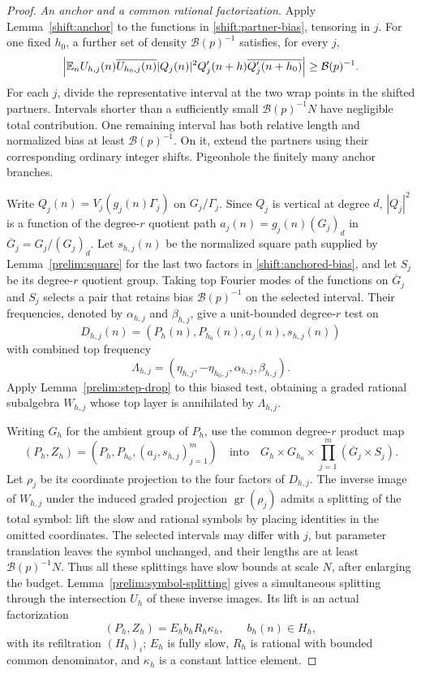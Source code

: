 \begin{proof}
\emph{An anchor and a common rational factorization.}
Apply Lemma~\ref{shift:anchor} to the functions in
\eqref{shift:partner-bias}, tensoring in $j$.
For one fixed $h_0$, a further set of density
$\mathcal B(p)^{-1}$ satisfies, for every $j$,
\begin{equation}\label{shift:anchored-bias}
 \left|\mathbb E_n U_{h,j}(n)\overline{U_{h_0,j}(n)}
 |Q_j(n)|^2Q'_j(n+h)\overline{Q'_j(n+h_0)}\right|
 \geq\mathcal B(p)^{-1}.
\end{equation}
For each $j$, divide the representative interval at the two wrap
points in the shifted partners.  Intervals shorter than a
sufficiently small $\mathcal B(p)^{-1}N$ have negligible total
contribution.  One remaining interval has both relative length
and normalized bias at least $\mathcal B(p)^{-1}$.
On it, extend the partners using their corresponding ordinary
integer shifts.  Pigeonhole the finitely many anchor branches.

Write $Q_j(n)=V_j(g_j(n)\Gamma_j)$ on $G_j/\Gamma_j$.
Since $Q_j$ is vertical at degree $d$, $|Q_j|^2$ is a function
of the degree-$r$ quotient path $a_j(n)=g_j(n)(G_j)_d$ in
$\overline G_j=G_j/(G_j)_d$.
Let $s_{h,j}(n)$ be the normalized square path supplied by
Lemma~\ref{prelim:square} for the last two factors in
\eqref{shift:anchored-bias}, and let $S_j$ be its degree-$r$
quotient group.  Taking top Fourier modes of the functions on
$\overline G_j$ and $S_j$ selects a pair that retains bias
$\mathcal B(p)^{-1}$ on the selected interval.  Their frequencies,
denoted by $\alpha_{h,j}$ and $\beta_{h,j}$, give a unit-bounded
degree-$r$ test on
\[
 D_{h,j}(n)=(P_h(n),P_{h_0}(n),a_j(n),s_{h,j}(n))
\]
with combined top frequency
\[
 \Lambda_{h,j}
 = (\eta_{h,j},-\eta_{h_0,j},\alpha_{h,j},\beta_{h,j}).
\]
Apply Lemma~\ref{prelim:step-drop} to this biased test, obtaining
a graded rational subalgebra $W_{h,j}$ whose top layer is
annihilated by $\Lambda_{h,j}$.

Writing $G_h$ for the ambient group of $P_h$, use the common
degree-$r$ product map
\[
 (P_h,Z_h)=(P_h,P_{h_0},(a_j,s_{h,j})_{j=1}^m)
 \quad\text{into}\quad
 G_h\times G_{h_0}\times\prod_{j=1}^m(\overline G_j\times S_j).
\]
Let $\rho_j$ be its coordinate projection to the four factors
of $D_{h,j}$.  The inverse image of $W_{h,j}$ under the induced
graded projection $\operatorname{gr}(\rho_j)$ admits a splitting
of the total symbol: lift the slow and rational symbols by placing
identities in the omitted coordinates.  The selected intervals may
differ with $j$, but parameter translation leaves the symbol unchanged,
and their lengths are at least $\mathcal B(p)^{-1}N$.  Thus all
these splittings have slow bounds at scale $N$, after enlarging the
budget.  Lemma~\ref{prelim:symbol-splitting} gives a simultaneous
splitting through the intersection $U_h$ of these inverse images.
Its lift is an actual factorization
\begin{equation}\label{shift:actual-factorization}
 (P_h,Z_h)=E_hb_hR_h\kappa_h,
 \qquad b_h(n)\in H_h,
\end{equation}
with its refiltration $(H_h)_i$; $E_h$ is fully slow, $R_h$ is
rational with bounded common denominator, and $\kappa_h$ is
a constant lattice element.


\end{proof}
